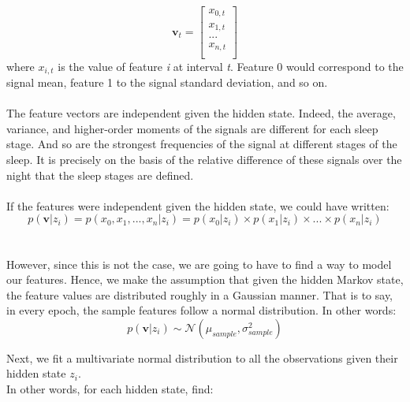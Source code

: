 \documentclass[10pt,a4paper]{report}
\begin{document}
\begin{equation}
\textbf{v}_{t} = \begin{bmatrix}
							x_{0, t}\\
							x_{1,t}\\
							...\\
							x_{n, t}\\
							\end{bmatrix}
\end{equation}
where $x_{i,t}$ is the value of feature \textit{i} at interval \textit{t}.
Feature {0} would correspond to the signal mean, feature {1} to the signal standard deviation, and so on.
\\\\
The feature vectors are independent given the hidden state. Indeed, the average, variance, and higher-order moments of the signals are different for each sleep stage. And so are the strongest frequencies of the signal at different stages of the sleep. It is precisely on the basis of the relative difference of these signals over the night that the sleep stages are defined. 
\\\\
If the features were independent given the hidden state, we could have written: \\
$$ 
p(\textbf{v} | z_i) = p(x_0, x_1, ..., x_n | z_i) = p(x_0|z_i) \times p(x_1|z_i) \times ... \times p(x_n|z_i)
$$
\\\\
However, since this is not the case, we are going to have to find a way to model our features. Hence, we make the assumption that given the hidden Markov state, the feature values are distributed roughly in a Gaussian manner. That is to say, in every epoch, the sample features follow a normal distribution. In other words:
\\
\begin{equation}
p( \textbf{v} | z_{i} ) \sim  \mathcal{N}(\mu_{sample}, \sigma^2_{sample})
\end{equation}

Next, we fit a multivariate normal distribution to all the observations given their hidden state $z_{i}$. \\
In other words, for each hidden state, find:\\
\end{document}
